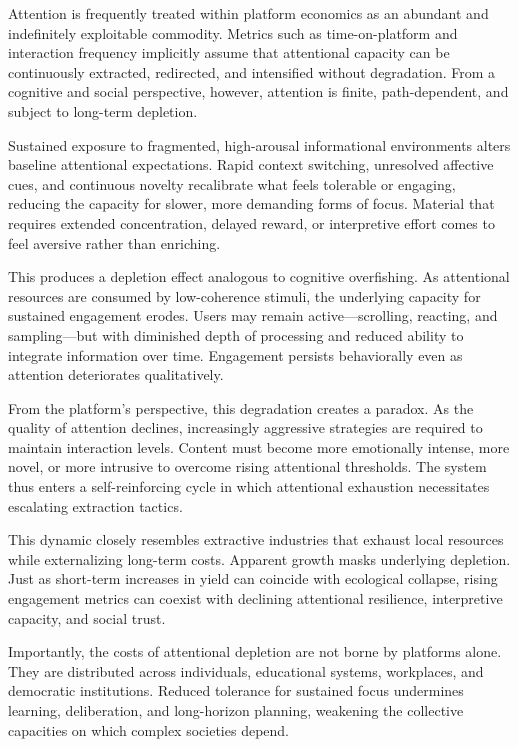 \documentclass[12pt]{article}
\begin{document}
Attention is frequently treated within platform economics as an abundant and indefinitely exploitable commodity. Metrics such as time-on-platform and interaction frequency implicitly assume that attentional capacity can be continuously extracted, redirected, and intensified without degradation. From a cognitive and social perspective, however, attention is finite, path-dependent, and subject to long-term depletion.

Sustained exposure to fragmented, high-arousal informational environments alters baseline attentional expectations. Rapid context switching, unresolved affective cues, and continuous novelty recalibrate what feels tolerable or engaging, reducing the capacity for slower, more demanding forms of focus. Material that requires extended concentration, delayed reward, or interpretive effort comes to feel aversive rather than enriching.

This produces a depletion effect analogous to cognitive overfishing. As attentional resources are consumed by low-coherence stimuli, the underlying capacity for sustained engagement erodes. Users may remain active—scrolling, reacting, and sampling—but with diminished depth of processing and reduced ability to integrate information over time. Engagement persists behaviorally even as attention deteriorates qualitatively.

From the platform’s perspective, this degradation creates a paradox. As the quality of attention declines, increasingly aggressive strategies are required to maintain interaction levels. Content must become more emotionally intense, more novel, or more intrusive to overcome rising attentional thresholds. The system thus enters a self-reinforcing cycle in which attentional exhaustion necessitates escalating extraction tactics.

This dynamic closely resembles extractive industries that exhaust local resources while externalizing long-term costs. Apparent growth masks underlying depletion. Just as short-term increases in yield can coincide with ecological collapse, rising engagement metrics can coexist with declining attentional resilience, interpretive capacity, and social trust.

Importantly, the costs of attentional depletion are not borne by platforms alone. They are distributed across individuals, educational systems, workplaces, and democratic institutions. Reduced tolerance for sustained focus undermines learning, deliberation, and long-horizon planning, weakening the collective capacities on which complex societies depend.
\end{document}
